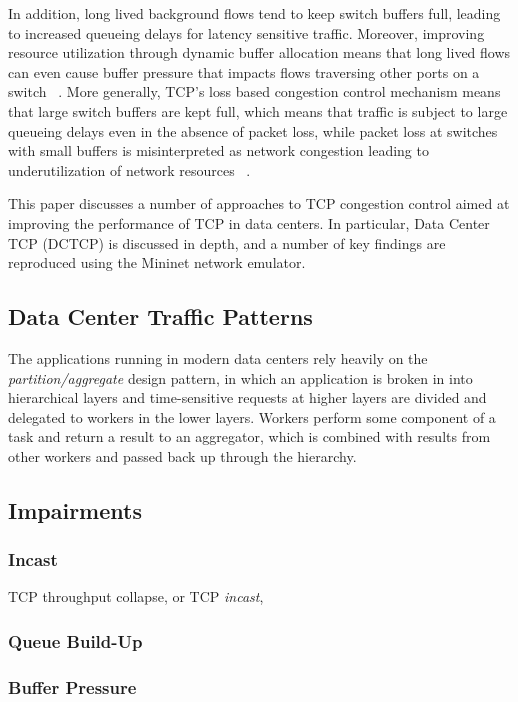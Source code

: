 In addition, long lived background flows tend to keep switch buffers full, leading to increased queueing delays for latency sensitive traffic. Moreover, improving resource utilization through dynamic buffer allocation means that long lived flows can even cause buffer pressure that impacts flows traversing other ports on a switch ~\cite{alizadeh_data_2010}. More generally, TCP's loss based congestion control mechanism means that large switch buffers are kept full, which means that traffic is subject to large queueing delays even in the absence of packet loss, while packet loss at switches with small buffers is misinterpreted as network congestion leading to underutilization of network resources ~\cite{cardwell_bbr:_2016}.

This paper discusses a number of approaches to TCP congestion control aimed at improving the performance of TCP in data centers. In particular, Data Center TCP (DCTCP) is discussed in depth, and a number of key findings are reproduced using the Mininet network emulator.

\subsection{Data Center Traffic Patterns}

The applications running in modern data centers rely heavily on the \emph{partition/aggregate} design pattern, in which an application is broken in into hierarchical layers and time-sensitive requests at higher layers are divided and delegated to workers in the lower layers. Workers perform some component of a task and return a result to an aggregator, which is combined with results from other workers and passed back up through the hierarchy. 

\subsection{Impairments}

\subsubsection{Incast}

TCP throughput collapse, or TCP \emph{incast},  

\subsubsection{Queue Build-Up}

\subsubsection{Buffer Pressure}

